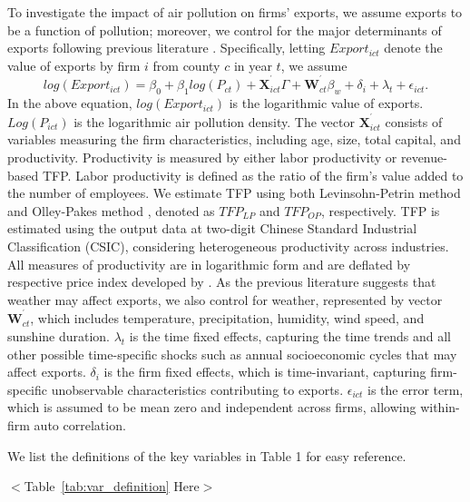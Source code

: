 \documentclass[12pt]{article}
\begin{document}
To investigate the impact of air pollution on firms' exports, we assume
exports to be a function of pollution; moreover, we control for the major
determinants of exports following previous literature %
\citep[e.g.,][]{Kunst1989,Bernard2003}. Specifically, letting $Export_{ict}$
denote the value of exports by firm $i$ from county $c$ in year $t$, we
assume 
\begin{equation}
log(Export_{ict})=\beta _{0}+\beta _{1}log(P_{ct})+\mathbf{X}%
_{ict}^{^{\prime }}\Gamma +\mathbf{W}_{ct}^{^{\prime }}\beta _{w}+\delta
_{i}+\lambda _{t}+\epsilon _{ict}.  \label{equ1}
\end{equation}%
In the above equation, $log(Export_{ict})$ is the logarithmic value of
exports. $Log(P_{ict})$ is the logarithmic air pollution density. The vector 
$\mathbf{X}_{ict}^{^{\prime }}$ consists of variables measuring the firm
characteristics, including age, size, total capital, and productivity.
Productivity is measured by either labor productivity or revenue-based TFP.
Labor productivity is defined as the ratio of the firm's value added to the
number of employees. We estimate TFP using both Levinsohn-Petrin method %
\citep{levinsohn2003estimating} and Olley-Pakes method %
\citep{olley1996dynamics}, denoted as $TFP_{LP}$ and $TFP_{OP}$,
respectively. TFP is estimated using the output data at two-digit Chinese
Standard Industrial Classification (CSIC), considering heterogeneous
productivity across industries. All measures of productivity are in
logarithmic form and are deflated by respective price index developed by %
\citep{brandt2017wto}. As the previous literature %
\citep[e.g.,][]{jones2010climate} suggests that weather may affect exports,
we also control for weather, represented by vector $\mathbf{W}%
_{ct}^{^{\prime }}$, which includes temperature, precipitation, humidity,
wind speed, and sunshine duration. $\lambda _{t}$ is the time fixed effects,
capturing the time trends and all other possible time-specific shocks such
as annual socioeconomic cycles that may affect exports. $\delta _{i}$ is the
firm fixed effects, which is time-invariant, capturing firm-specific
unobservable characteristics contributing to exports. $\epsilon _{ict}$ is
the error term, which is assumed to be mean zero and independent across
firms, allowing within-firm auto correlation.

We list the definitions of the key variables in Table 1 for easy reference.

\begin{center}
$<$Table~\ref{tab:var_definition} Here$>$
\end{center}
\end{document}
